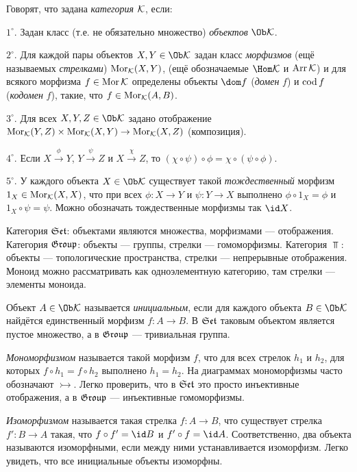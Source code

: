 \documentclass[10pt,a4paper]{article}%
\begin{document}
Говорят, что задана \emph{категория} $\mathcal{K}$, если:
\par $1^\circ$. Задан класс (т.е. не обязательно множество)
{\em объектов} $\Ob\Ck$.
\par $2^\circ$. Для каждой пары объектов $X,Y\in\Ob\Ck$ задан
класс {\em морфизмов} (ещё называемых {\em
стрелками}) $\operatorname{Mor}_{\mathcal{K}}(X,Y)$, (ещё обозначаемые
$\Hom\Ck$ и $\operatorname{Arr}\mathcal{K}$) и для всякого морфизма $f\in\operatorname{Mor}\mathcal{K}$
определены объекты $\dom f$ ({\em домен} $f$) и $\operatorname{cod}
f$ ({\em кодомен} $f$), такие, что
$f\in\operatorname{Mor}_{\mathcal{K}}(A,B)$.
\par $3^\circ$. Для всех $X,Y,Z\in\Ob\Ck$ задано отображение $\operatorname{Mor}_{\mathcal{K}}(Y,Z)
\times\operatorname{Mor}_{\mathcal{K}}(X,Y)\rightarrow\operatorname{Mor}_{\mathcal{K}}(X,Z)$ (композиция).
\par $4^\circ$. Если $X\stackrel{\phi}\to Y$,
$Y\stackrel{\psi}\to Z$ и $X\stackrel{\chi}\to Z$, то
$(\chi\circ\psi)\circ\phi=\chi\circ(\psi\circ\phi)$.
\par $5^\circ$. У каждого объекта $X\in\Ob\Ck$ существует такой
{\em тождественный} морфизм
$1_X\in\operatorname{Mor}_{\mathcal{K}}(X,X)$, что при всех $\phi:X\to Y$ и $\psi:Y\to
X$ выполнено $\phi\circ 1_X=\phi$ и $1_X\circ\psi=\psi$. Можно
обозначать тождественные морфизмы так $\id X$.

\begin{ex}
Категория $\mathfrak{Set}$: объектами являются
множества, морфизмами
--- отображения. Категория $\mathfrak{Group}$: объекты --- группы, стрелки
--- гомоморфизмы. Категория $\Top$: объекты --- топологические
пространства, стрелки --- непрерывные отображения. Моноид можно
рассматривать как одноэлементную категорию, там стрелки ---
элементы моноида.
\end{ex}

Объект $A\in\Ob\Ck$ называется {\em
инициальным}, если для каждого объекта
$B\in\Ob\Ck$ найдётся единственный морфизм $f:A\to B$. В $\mathfrak{Set}$
таковым объектом является пустое множество, а в $\mathfrak{Group}$
--- тривиальная группа.

{\em Мономорфизмом} называется такой морфизм
$f$, что для всех стрелок $h_1$ и $h_2$, для которых $f\circ
h_1=f\circ h_2$ выполнено $h_1=h_2$. На диаграммах мономорфизмы
часто обозначают $\rightarrowtail$. Легко проверить, что в $\mathfrak{Set}$
это просто инъективные отображения, а в $\mathfrak{Group}$ --- инъективные
гомоморфизмы.

{\em Изоморфизмом} называется такая стрелка
$f:A\to B$, что существует стрелка $f':B\to A$ такая, что $f\circ
f'=\id B$ и $f'\circ f=\id A$. Соответственно, два объекта
называются изоморфными, если между ними устанавливается
изоморфизм. Легко увидеть, что все инициальные объекты изоморфны.
\end{document}
